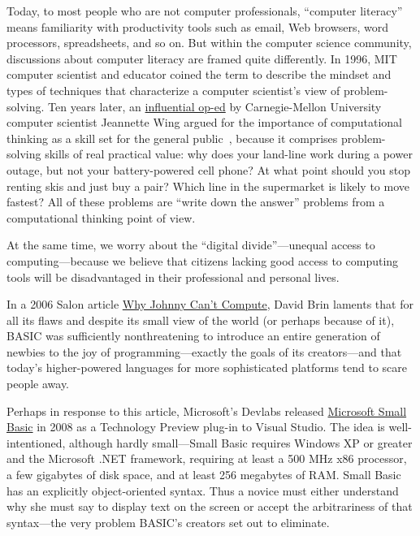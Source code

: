 \documentclass{article}
\begin{document}
Today, to most people who are not computer professionals, ``computer
literacy'' means familiarity with 
productivity tools such as email, Web browsers, word processors,
spreadsheets, and so on.  
But within the computer science community, discussions about computer
literacy are framed quite differently.  
In 1996, MIT computer scientist and educator
 coined the term  to
describe the mindset and types of techniques that
characterize a computer scientist's view of problem-solving.
Ten years later, an
\href{http://www.cs.cmu.edu/afs/cs/usr/wing/www/publications/Wing06.pdf}{influential op-ed} by Carnegie-Mellon University computer scientist
Jeannette Wing argued for the importance of computational thinking as a
skill set for the general 
public~\cite{wing_computational_thinking}, because it comprises
problem-solving skills of real practical value: why does your land-line
work during a power outage, but not your battery-powered cell phone?  At
what point should you stop renting skis and just buy a pair?  Which line
in the supermarket is likely to move fastest?  All of these problems are
``write down the answer'' problems from a computational thinking point
of view.

At the same time, we worry about the ``digital divide''---unequal access
to computing---because we believe that citizens lacking good access to
computing tools will be disadvantaged in their professional and personal
lives.

In a 2006 Salon article \href{www.salon.com/2006/09/14/basic_2}{Why Johnny
  Can't Compute},
David Brin laments that for
all its flaws and despite its small view of the world (or perhaps
because of it), BASIC was sufficiently
nonthreatening to introduce an entire generation of newbies
to the joy of programming---exactly
the goals of its creators---and that today's higher-powered languages
for more sophisticated platforms tend to scare people away.

\begin{geeknote}
Perhaps in response to this article, Microsoft's Devlabs 
released \href{http://smallbasic.com}{Microsoft Small Basic} in 2008 as a
Technology Preview plug-in to Visual Studio.
The idea is well-intentioned, although hardly small---Small Basic
requires Windows XP or greater and the Microsoft .NET framework,
requiring at least a 500
MHz x86 processor, a few gigabytes of disk space, and at least 256
megabytes of RAM.
Small Basic has an explicitly
object-oriented syntax.  Thus a novice must either understand why she
must say  to display text on the
screen or accept the arbitrariness of that syntax---the very problem
BASIC's creators set out to eliminate.  
\end{geeknote}
\end{document}
